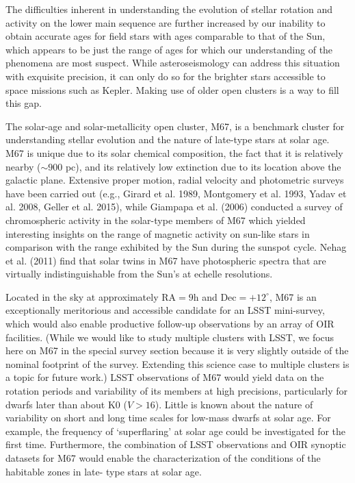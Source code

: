 The difficulties inherent in understanding the evolution of stellar
rotation and activity on the lower main sequence are further increased
by our inability to obtain accurate ages for field stars with ages
comparable to that of the Sun, which appears to be just the range
of ages for which our understanding of the phenomena are most suspect.
While asteroseismology can address this situation with exquisite precision,
it can only do so for the brighter stars accessible to space missions
such as Kepler. Making use of older open clusters is a way to fill
this gap.

The solar-age and solar-metallicity open cluster, M67, is a benchmark
cluster for understanding stellar evolution and the nature of late-type
stars at solar age. M67 is unique due to its solar chemical composition,
the fact that it is relatively nearby ($\sim900$ pc), and its relatively
low extinction due to its location above the galactic plane. Extensive
proper motion, radial velocity and photometric surveys have been carried
out (e.g., Girard et al. 1989, Montgomery et al. 1993, Yadav et al.
2008, Geller et al. 2015), while Giampapa et al. (2006) conducted
a survey of chromospheric activity in the solar-type members of M67
which yielded interesting insights on the range of magnetic activity
on sun-like stars in comparison with the range exhibited by the Sun
during the sunspot cycle. Nehag et al. (2011) find that solar twins
in M67 have photospheric spectra that are virtually indistinguishable
from the Sun\textquoteright{}s at echelle resolutions.

Located in the sky at approximately $\mathrm{RA}=9\mathrm{h}$ and
$\mathrm{Dec}=+12^{\circ}$, M67 is an exceptionally meritorious and
accessible candidate for an LSST mini-survey, which would also enable
productive follow-up observations by an array of OIR facilities.
(While we would like to study multiple clusters with LSST, we focus here on M67 in the special survey section because it is very slightly outside of the nominal footprint of the survey. Extending this science case to multiple clusters is a topic for future work.) LSST
observations of M67 would yield data on the rotation periods and variability
of its members at high precisions, particularly for dwarfs later than
about K0 ($V>16$). Little is known about the nature of variability
on short and long time scales for low-mass dwarfs at solar age. For
example, the frequency of \textquoteleft{}superflaring\textquoteright{}
at solar age could be investigated for the first time. Furthermore,
the combination of LSST observations and OIR synoptic datasets for
M67 would enable the characterization of the conditions of the habitable
zones in late- type stars at solar age.

